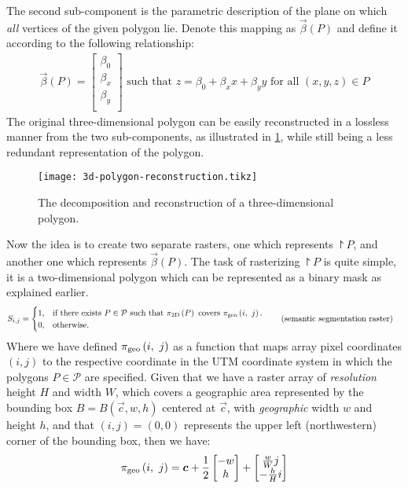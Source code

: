 The second sub-component is the parametric description of the plane on which \emph{all} vertices of the given polygon lie.
Denote this mapping as $\vec{\beta}(P)$ and define it according to the following relationship:
\begin{align*}
  \vec{\beta}(P)
  =
  \begin{bmatrix}
    \beta_0 \\
    \beta_x \\
    \beta_y \\
  \end{bmatrix}
  \text{ such that }
  z = \beta_0 + \beta_x x + \beta_y y \text{ for all } (x, y, z) \in P
\end{align*}
The original three-dimensional polygon can be easily reconstructed in a lossless manner from the two sub-components, as illustrated in \cref{fig:3d-polygon-reconstruction}, while still being a less redundant representation of the polygon.
%
\begin{figure}[H]
  \centering
  \texttt{[image: 3d-polygon-reconstruction.tikz]}
  \caption{%
    The decomposition and reconstruction of a three-dimensional polygon.
  }%
  \label{fig:3d-polygon-reconstruction}
\end{figure}
\noindent
Now the idea is to create two separate rasters, one which represents $\project{P}$, and another one which represents $\vec{\beta}(P)$.
The task of rasterizing $\project{P}$ is quite simple, it is a two-dimensional polygon which can be represented as a binary mask as explained earlier.
\begin{align*}
  S_{i,j} &= \begin{cases}
    1, &\text{if there exists } P \in \mathcal{P} \text{ such that } \pi_{\mathrm{2D}}\left(P\right) \text{ covers } \pi_{\mathrm{geo}}\left(i,~j\right).\\
    0, &\text{otherwise.}
  \end{cases}
  \tag{semantic segmentation raster}
\end{align*}
Where we have defined $\pi_{\mathrm{geo}}\left(i,~j\right)$ as a function that maps array pixel coordinates $(i, j)$ to the respective coordinate in the UTM coordinate system in which the polygons $P \in \mathcal{P}$ are specified.
Given that we have a raster array of \emph{resolution} height $H$ and width $W$, which covers a geographic area represented by the bounding box $B = B(\vec{c}, w, h)$ centered at $\vec{c}$, with \emph{geographic} width $w$ and height $h$, and that $(i, j) = (0, 0)$ represents the upper left (northwestern) corner of the bounding box, then we have:
\begin{equation*}
  \pi_{\mathrm{geo}}\left(i,~j\right)
  =
  \boldsymbol{c}
  +
  \frac{1}{2} \begin{bmatrix}
    -w\\
    h
  \end{bmatrix}
  +
  \begin{bmatrix}
    \frac{w}{W} j\\
    -\frac{h}{H} i\\
  \end{bmatrix}
\end{equation*}
